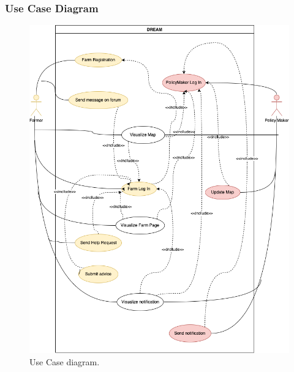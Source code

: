 \subsubsection{Use Case Diagram}
\begin{figure}[H]
    \begin{center}
    \includegraphics[width=1\textwidth]{images/useCaseDiag.drawio.png}
    \caption{Use Case diagram.}
    \label{fig:state9}
    \end{center}
\end{figure}

